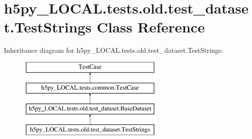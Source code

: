 \hypertarget{classh5py__LOCAL_1_1tests_1_1old_1_1test__dataset_1_1TestStrings}{}\section{h5py\+\_\+\+L\+O\+C\+A\+L.\+tests.\+old.\+test\+\_\+dataset.\+Test\+Strings Class Reference}
\label{classh5py__LOCAL_1_1tests_1_1old_1_1test__dataset_1_1TestStrings}
Inheritance diagram for h5py\+\_\+\+L\+O\+C\+A\+L.\+tests.\+old.\+test\+\_\+dataset.\+Test\+Strings\+:\begin{figure}[H]
\begin{center}
\leavevmode
\includegraphics[height=4.000000cm]{classh5py__LOCAL_1_1tests_1_1old_1_1test__dataset_1_1TestStrings}
\end{center}
\end{figure}
